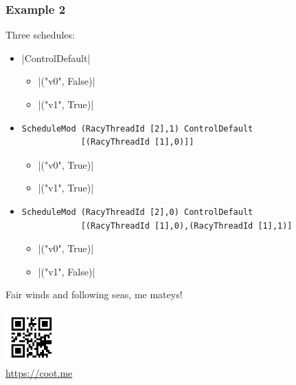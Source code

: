 \documentclass[t,x11names,xcolor={x11names},hyperref={colorlinks,citecolor=Blue4,linkcolor=Blue4,anchorcolor=Blue4,urlcolor=Blue4}]{beamer}
\begin{document}
\begin{frame}[fragile]
  \frametitle{Example 2}
  Three schedules:

  {\small\begin{itemize}
    \item<2-> |ControlDefault|
              \begin{itemize}
                \item[] |("v0", False)|
                \item[] |("v1", True)|
              \end{itemize}
    \item<3-> \begin{verbatim}
ScheduleMod (RacyThreadId [2],1) ControlDefault
            [(RacyThreadId [1],0)]]
              \end{verbatim}
              \begin{itemize}
                \item[] |("v0", True)|
                \item[] |("v1", True)|
              \end{itemize}
    \item<4-> \begin{verbatim}
ScheduleMod (RacyThreadId [2],0) ControlDefault
            [(RacyThreadId [1],0),(RacyThreadId [1],1)]
              \end{verbatim}
              \begin{itemize}
                \item[] |("v0", True)|
                \item[] |("v1", False)|
              \end{itemize}
    \end{itemize}}
\end{frame}

\begin{frame}
  \vspace{10em}
  \begin{center}
  {\huge Fair winds and following seas, me mateys!}\\
  \end{center}
  \vspace{2em}
  \begin{flushright}
    \includegraphics[width=2cm]{coot.me.png}\\
    \url{https://coot.me}
  \end{flushright}
\end{frame}
\end{document}
